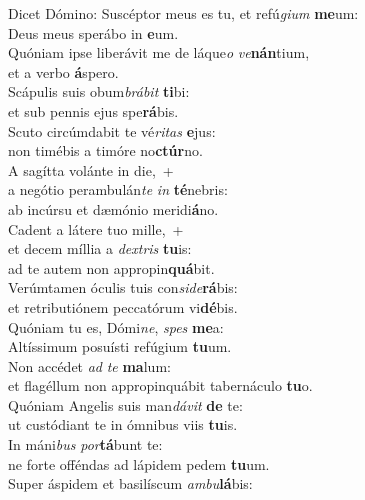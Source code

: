 \evenverse Dicet Dómino: Suscéptor meus es tu, et refú\textit{gi}\textit{um} \textbf{me}um:~\*\\
\evenverse Deus meus sperábo in \textbf{e}um.\\
\oddverse Quóniam ipse liberávit me de láque\textit{o} \textit{ve}\textbf{nán}tium,~\*\\
\oddverse et a verbo \textbf{á}spero.\\
\evenverse Scápulis suis obum\textit{brá}\textit{bit} \textbf{ti}bi:~\*\\
\evenverse et sub pennis ejus spe\textbf{rá}bis.\\
\oddverse Scuto circúmdabit te vé\textit{ri}\textit{tas} \textbf{e}jus:~\*\\
\oddverse non timébis a timóre no\textbf{ctúr}no.\\
\evenverse A sagítta volánte in die,~+\\
\evenverse  a negótio perambulán\textit{te} \textit{in} \textbf{té}nebris:~\*\\
\evenverse ab incúrsu et dæmónio meridi\textbf{á}no.\\
\oddverse Cadent a látere tuo mille,~+\\
\oddverse  et decem míllia a \textit{dex}\textit{tris} \textbf{tu}is:~\*\\
\oddverse ad te autem non appropin\textbf{quá}bit.\\
\evenverse Verúmtamen óculis tuis con\textit{si}\textit{de}\textbf{rá}bis:~\*\\
\evenverse et retributiónem peccatórum vi\textbf{dé}bis.\\
\oddverse Quóniam tu es, Dómi\textit{ne}, \textit{spes} \textbf{me}a:~\*\\
\oddverse Altíssimum posuísti refúgium \textbf{tu}um.\\
\evenverse Non accédet \textit{ad} \textit{te} \textbf{ma}lum:~\*\\
\evenverse et flagéllum non appropinquábit tabernáculo \textbf{tu}o.\\
\oddverse Quóniam Angelis suis man\textit{dá}\textit{vit} \textbf{de} te:~\*\\
\oddverse ut custódiant te in ómnibus viis \textbf{tu}is.\\
\evenverse In máni\textit{bus} \textit{por}\textbf{tá}bunt te:~\*\\
\evenverse ne forte offéndas ad lápidem pedem \textbf{tu}um.\\
\oddverse Super áspidem et basilíscum \textit{am}\textit{bu}\textbf{lá}bis:~\*\\
